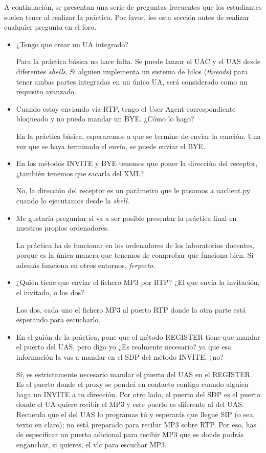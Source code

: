 \documentclass[a4paper,11pt]{article}
\begin{document}
A continuación, se presentan una serie de preguntas frecuentes que los estudiantes
suelen tener al realizar la práctica. Por favor, lee esta sección antes de realizar
cualquier pregunta en el foro.

\begin{itemize}

\item ¿Tengo que crear un UA integrado?

Para la práctica básica no hace falta. Se puede lanzar el UAC y el UAS desde diferentes \emph{shells}. Si alguien implementa un sistema de hilos (\emph{threads}) para tener ambas partes integradas en un único UA, será considerado como un requisito avanzado.

\item Cuando estoy enviando vía RTP, tengo el User Agent correspondiente bloqueado y no puedo mandar un BYE. ¿Cómo lo hago?

En la práctica básica, esperaremos a que se termine de enviar la canción. Una vez que se haya terminado el envío, se puede enviar el BYE.

\item En los métodos INVITE y BYE tenemos que poner la dirección del receptor, ¿también tenemos que sacarla del XML?

No, la dirección del receptor es un parámetro que le pasamos a uaclient.py cuando lo ejecutamos desde la \emph{shell}.

\item Me gustaría preguntar si va a ser posible presentar la práctica final en nuestros propios ordenadores.

La práctica ha de funcionar en los ordenadores de los laboratorios docentes, porque es la única manera que tenemos de comprobar que funciona bien. Si además funciona
en otros entornos, \emph{ferpecto}.

\item ¿Quién tiene que enviar el fichero MP3 por RTP? ¿El que envía la invitación, el invitado, o los dos?

Los dos, cada uno el fichero MP3 al puerto RTP donde la otra parte está esperando para escucharlo.

\item En el guión de la práctica, pone que el
método REGISTER tiene que mandar el puerto del UAS, pero digo yo ¿Es
realmente necesario? ya que esa información la vas a mandar en el SDP
del método INVITE, ¿no?

Sí, es estrictamente necesario mandar el puerto del UAS en el REGISTER.
Es el puerto donde el proxy se pondrá en contacto contigo cuando alguien haga
un INVITE a tu dirección. Por otro lado, el puerto del SDP es el puerto donde el UA quiere recibir el MP3 y este puerto es diferente al del UAS. Recuerda que el del UAS lo programas tú y esperarás que llegue SIP (o sea, texto en claro); no está preparado para recibir MP3 sobre RTP. Por eso, has de especificar un puerto adicional para recibir MP3 que es donde podrás enganchar, si quieres, el vlc para escuchar MP3.


\end{itemize}
\end{document}
